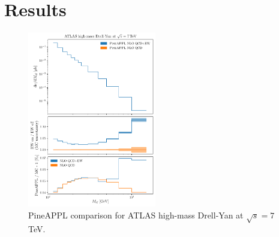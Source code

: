 \section{Results}
\label{sec:results}

\begin{figure}
    \centering
    \includegraphics[width=0.5\textwidth]{figures/pineappl_ATLASZHIGHMASS49FB}
    \caption{PineAPPL comparison for ATLAS high-mass Drell-Yan at $\sqrt{s}=7$ TeV.}
    \label{fig:atlaszhighmass49fb}
\end{figure}


